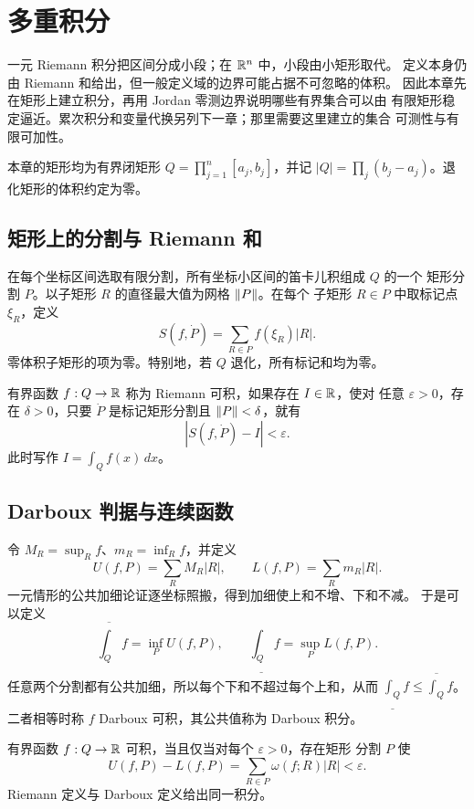 \chapter{多重积分}
\label{chap:multiple-integrals}

一元 Riemann 积分把区间分成小段；在 $\mathbb{R}^n$ 中，小段由小矩形取代。
定义本身仍由 Riemann 和给出，但一般定义域的边界可能占据不可忽略的体积。
因此本章先在矩形上建立积分，再用 Jordan 零测边界说明哪些有界集合可以由
有限矩形稳定逼近。累次积分和变量代换另列下一章；那里需要这里建立的集合
可测性与有限可加性。

本章的矩形均为有界闭矩形
$Q=\prod_{j=1}^n[a_j,b_j]$，并记
$|Q|=\prod_j(b_j-a_j)$。退化矩形的体积约定为零。

\section{矩形上的分割与 Riemann 和}

在每个坐标区间选取有限分割，所有坐标小区间的笛卡儿积组成 $Q$ 的一个
矩形分割 $P$。以子矩形 $R$ 的直径最大值为网格 $\left\lVert P\right\rVert$。在每个
子矩形 $R\in P$ 中取标记点 $\xi_R$，定义
\[
 S(f,\dot P)=\sum_{R\in P}f(\xi_R)|R|.
\]
零体积子矩形的项为零。特别地，若 $Q$ 退化，所有标记和均为零。

\begin{definition}
有界函数 $f:Q\to\mathbb{R}$ 称为 Riemann 可积，如果存在 $I\in\mathbb{R}$，使对
任意 $\varepsilon>0$，存在 $\delta>0$，只要 $\dot P$ 是标记矩形分割且
$\left\lVert P\right\rVert<\delta$，就有
\[
 |S(f,\dot P)-I|<\varepsilon.
\]
此时写作 $I=\int_Q f(x)\,dx$。
\end{definition}

\section{Darboux 判据与连续函数}

令 $M_R=\sup_Rf$、$m_R=\inf_Rf$，并定义
\[
 U(f,P)=\sum_RM_R|R|,\qquad L(f,P)=\sum_Rm_R|R|.
\]
一元情形的公共加细论证逐坐标照搬，得到加细使上和不增、下和不减。
于是可以定义
\[
 \overline{\int_Q}f=\inf_PU(f,P),\qquad
 \underline{\int_Q}f=\sup_PL(f,P).
\]
任意两个分割都有公共加细，所以每个下和不超过每个上和，从而
$\underline{\int_Q}f\le\overline{\int_Q}f$。二者相等时称 $f$ Darboux
可积，其公共值称为 Darboux 积分。

\begin{theorem}[Darboux 判据]
\label{thm:multiple-darboux-criterion}
有界函数 $f:Q\to\mathbb{R}$ 可积，当且仅当对每个 $\varepsilon>0$，存在矩形
分割 $P$ 使
\[
 U(f,P)-L(f,P)=\sum_{R\in P}\omega(f;R)|R|<\varepsilon.
\]
Riemann 定义与 Darboux 定义给出同一积分。
\end{theorem}

